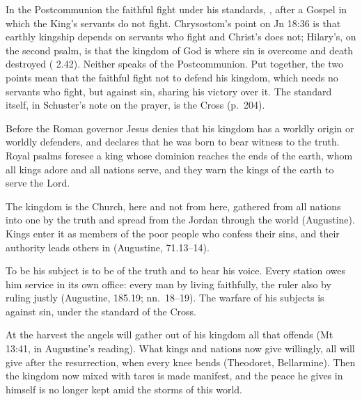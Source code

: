 In the Postcommunion the faithful fight under his standards, , after a Gospel in which the King's servants do not fight.
Chrysostom's point on Jn 18:36 is that earthly kingship depends on servants who
fight and Christ's does not; Hilary's, on the second psalm, is that the kingdom
of God is where sin is overcome and death destroyed ( 2.42). Neither speaks of the Postcommunion. Put together, the two
points mean that the faithful fight not to defend his kingdom, which needs no servants who fight,
but against sin, sharing his victory over it. The standard itself, in
Schuster's note on the prayer, is the Cross (p.~204).

\begin{fourSenses}
\item[Literal.] Before the Roman governor Jesus denies that his kingdom has a
worldly origin or worldly defenders, and declares that he was born to bear
witness to the truth. Royal psalms foresee a king whose dominion reaches the
ends of the earth, whom all kings adore and all nations serve, and they warn
the kings of the earth to serve the Lord.
\item[Allegorical.] The kingdom is the Church, here and not from here, gathered
from all nations into one by the truth and spread from the Jordan through the
world (Augustine). Kings enter it as members of the poor people who confess
their sins, and their authority leads others in (Augustine,  71.13--14).
\item[Moral.] To be his subject is to be of the truth and to hear his voice.
Every station owes him service in its own office: every man by living
faithfully, the ruler also by ruling justly (Augustine,  185.19;
 nn.~18--19). The warfare of his subjects is against sin,
under the standard of the Cross.
\item[Anagogical.] At the harvest the angels will gather out of his kingdom all
that offends (Mt 13:41, in Augustine's reading). What kings and nations now
give willingly, all will give after the resurrection, when every knee bends
(Theodoret, Bellarmine). Then the kingdom now mixed with tares is made
manifest, and the peace he gives in himself is no longer kept amid the storms
of this world.
\end{fourSenses}
